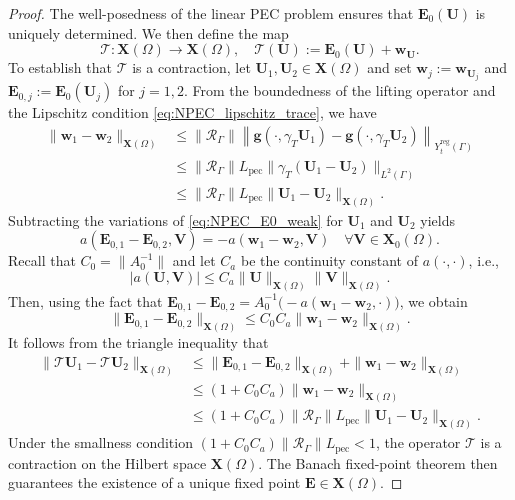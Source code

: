 \documentclass[10pt,a4paper]{amsart}
\numberwithin{equation}{section}
\begin{document}
\begin{proof}
The well-posedness of the linear PEC problem ensures that $\mathbf{E}_0(\mathbf{U})$ is uniquely determined. We then define the map
\[
\mathcal{T} : \mathbf{X}(\Omega) \to \mathbf{X}(\Omega), \quad \mathcal{T}(\mathbf{U}) := \mathbf{E}_0(\mathbf{U}) + \mathbf{w}_{\mathbf{U}}.
\]
To establish that $\mathcal{T}$ is a contraction, let $\mathbf{U}_1, \mathbf{U}_2 \in \mathbf{X}(\Omega)$ and set $\mathbf{w}_j := \mathbf{w}_{\mathbf{U}_j}$ and $\mathbf{E}_{0,j} := \mathbf{E}_0(\mathbf{U}_j)$ for $j=1,2$. From the boundedness of the lifting operator and the Lipschitz condition \eqref{eq:NPEC_lipschitz_trace}, we have
\[
\begin{aligned}
\|\mathbf{w}_1 - \mathbf{w}_2\|_{\mathbf{X}(\Omega)} &\le \|\mathcal{R}_\Gamma\| \left\| \mathbf{g}(\cdot, \gamma_T \mathbf{U}_1) - \mathbf{g}(\cdot, \gamma_T \mathbf{U}_2) \right\|_{Y_t^{\mathrm{reg}}(\Gamma)} \\
&\le \|\mathcal{R}_\Gamma\| L_{\mathrm{pec}} \|\gamma_T(\mathbf{U}_1 - \mathbf{U}_2)\|_{L^2(\Gamma)} \\
&\le \|\mathcal{R}_\Gamma\| L_{\mathrm{pec}} \|\mathbf{U}_1 - \mathbf{U}_2\|_{\mathbf{X}(\Omega)}.
\end{aligned}
\]
Subtracting the variations of \eqref{eq:NPEC_E0_weak} for $\mathbf{U}_1$ and $\mathbf{U}_2$ yields
\[
a(\mathbf{E}_{0,1} - \mathbf{E}_{0,2}, \mathbf{V}) = -a(\mathbf{w}_1 - \mathbf{w}_2, \mathbf{V}) \quad \forall \mathbf{V} \in \mathbf{X}_0(\Omega).
\]
Recall that $C_0 = \|A_0^{-1}\|$ and let $C_a$ be the continuity constant of $a(\cdot,\cdot)$, i.e.,
\[
|a(\mathbf{U},\mathbf{V})| \le C_a \|\mathbf{U}\|_{\mathbf{X}(\Omega)}\|\mathbf{V}\|_{\mathbf{X}(\Omega)}.
\]
Then, using the fact that $\mathbf{E}_{0,1} - \mathbf{E}_{0,2} = A_0^{-1}\bigl(-a(\mathbf{w}_1-\mathbf{w}_2,\cdot)\bigr)$, we obtain
\[
\|\mathbf{E}_{0,1} - \mathbf{E}_{0,2}\|_{\mathbf{X}(\Omega)} \le C_0 C_a \|\mathbf{w}_1 - \mathbf{w}_2\|_{\mathbf{X}(\Omega)}.
\]
It follows from the triangle inequality that
\[
\begin{aligned}
\|\mathcal{T}\mathbf{U}_1 - \mathcal{T}\mathbf{U}_2\|_{\mathbf{X}(\Omega)} &\le \|\mathbf{E}_{0,1} - \mathbf{E}_{0,2}\|_{\mathbf{X}(\Omega)} + \|\mathbf{w}_1 - \mathbf{w}_2\|_{\mathbf{X}(\Omega)} \\
&\le (1 + C_0 C_a) \|\mathbf{w}_1 - \mathbf{w}_2\|_{\mathbf{X}(\Omega)} \\
&\le (1 + C_0 C_a) \|\mathcal{R}_\Gamma\| L_{\mathrm{pec}} \|\mathbf{U}_1 - \mathbf{U}_2\|_{\mathbf{X}(\Omega)}.
\end{aligned}
\]
Under the smallness condition $(1 + C_0 C_a) \|\mathcal{R}_\Gamma\| L_{\mathrm{pec}} < 1$, the operator $\mathcal{T}$ is a contraction on the Hilbert space $\mathbf{X}(\Omega)$. The Banach fixed-point theorem then guarantees the existence of a unique fixed point $\mathbf{E} \in \mathbf{X}(\Omega)$.


\end{proof}
\end{document}
